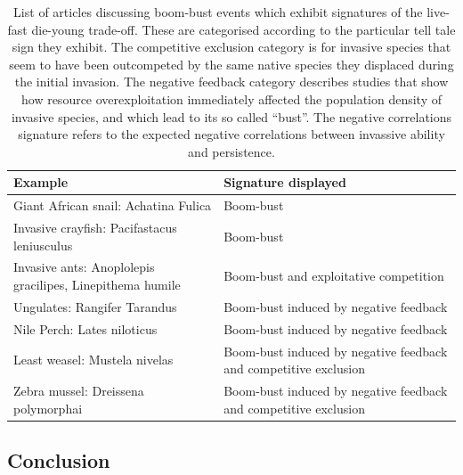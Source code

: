 \documentclass[a4paper]{report}
\begin{document}
\newpage

\begin{table}[H]
\caption{List of articles discussing boom-bust events which exhibit signatures of the live-fast die-young trade-off. These are categorised according to the particular tell tale sign they exhibit. The competitive exclusion category is for invasive species that seem to have been outcompeted by the same native species they displaced during the initial invasion. The negative feedback category describes studies that show how resource overexploitation immediately affected the population density of invasive species, and which lead to its so called “bust”. The negative correlations signature refers to the expected negative correlations between invassive ability and persistence.\label{tab:signatures}}
\begin{tabular}{|p{7.5cm}|p{7.5cm}|}
\hline
Example & Signature displayed\\
\hline
Giant African snail: Achatina Fulica & Boom-bust \\
\hline
Invasive crayfish: Pacifastacus leniusculus
& Boom-bust \\
\hline
Invasive ants: Anoplolepis gracilipes, Linepithema humile &
Boom-bust and exploitative competition \\
\hline
Ungulates: Rangifer Tarandus &
Boom-bust induced by negative feedback\\
\hline
Nile Perch: Lates niloticus &
Boom-bust induced by negative feedback \\
\hline
Least weasel: Mustela nivelas &
Boom-bust induced by negative feedback and competitive exclusion \\ 
\hline
Zebra mussel: Dreissena polymorphai &
Boom-bust induced by negative feedback and competitive exclusion \\
\hline
\end{tabular}
\end{table}

\subsection{Conclusion \label{sec:conclusion_emp}}
\end{document}
